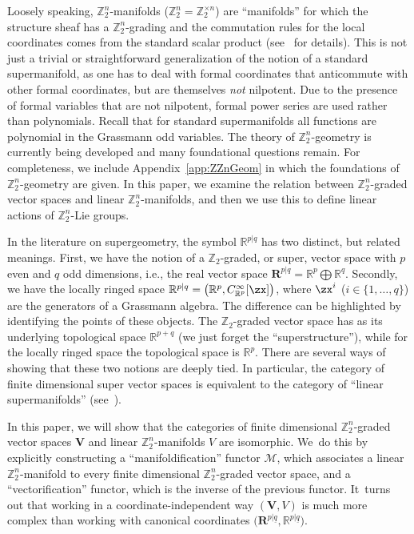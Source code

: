 \documentclass[pdftex]{sigma}%
\newcommand{\R}{{\mathbb R}}
\newcommand{\Z}{{\mathbb Z}}
\def\ul{\underline}
\def\ul{\underline}
\newcommand{\0}{\otimes}
\newcommand{\z}{\Z_2^n}
\numberwithin{equation}{section}
\begin{document}
Loosely speaking, $\Z_{2}^{n}$-manifolds ($\z=\Z_2^{\times n}$) are ``manifolds'' for which the structure sheaf has a $\Z_{2}^{n}$-grading and the commutation rules for the local coordinates comes from the standard scalar product (see~\cite{BruceGrabowski, Bruce:2019b, Bruce:2018, Bruce:2019,Covolo:2016,Covolo:2016a,Covolo:2016b, Covolo:2016c, Poncin:2016} for details). This is not just a trivial or straightforward generalization of the notion of a standard supermanifold, as one has to deal with formal coordinates that anticommute with other formal coordinates, but are themselves \emph{not} nilpotent. Due to the presence of formal variables that are not nilpotent, formal power series are used rather than polynomials. Recall that for standard supermanifolds all functions are polynomial in the Grassmann odd variables. The theory of $\Z_2^n$-geometry is currently being developed and many foundational questions remain. For completeness, we include Appendix~\ref{app:ZZnGeom} in which the foundations of $\Z_2^n$-geometry are given. In this paper, we examine the relation between $\Z_2^n$-graded vector spaces and linear $\Z_2^n$-manifolds, and then we use this to define linear actions of $\Z_2^n$-Lie groups.

In the literature on supergeometry, the symbol $\R^{p|q}$ has two distinct, but related meanings. First, we have the notion of a $\Z_2$-graded, or super, vector space with $p$ even and $q$ odd dimensions, i.e., the real vector space $\mathbf{R}^{p|q}=\R^p \bigoplus \R^q$. Secondly, we have the locally ringed space $\R^{p|q}=\big( \R^p, C^\infty_{\R^p}[\zx]\big)$, where $\zx^i$ ($i\in\{1, \dots, q\}$) are the generators of a Grassmann algebra. The difference can be highlighted by identifying the points of these objects. The $\Z_2$-graded vector space has as its underlying topological space $\R^{p+q}$ (we just forget the ``superstructure''), while for the locally ringed space the topological space is $\R^p$. There are several ways of showing that these two notions are deeply tied. In particular, the category of finite dimensional super vector spaces is equivalent to the category of ``linear supermanifolds'' (see~\cite{Bernstein:2013,Kostant:1977, Leites:1980, Leites:1991,Sanchez-Valenzuela:1988}).

In this paper, we will show that the categories of finite dimensional $\z$-graded vector spaces $\mathbf{V}$ and linear $\z$-manifolds $V$ are isomorphic. We~do this by explicitly constructing a ``manifoldification'' functor $\mathcal{M}$, which associates a linear $\z$-manifold to every finite dimensional $\Z_2^n$-graded vector space, and a ``vectorification'' functor, which is the inverse of the previous functor. It~turns out that working in a coordinate-independent way $(\mathbf{V}, V)$ is much more complex than working with canonical coordinates $\big(\mathbf{R}^{p|\ul q},\R^{p|\ul q}\big)$.
\end{document}
